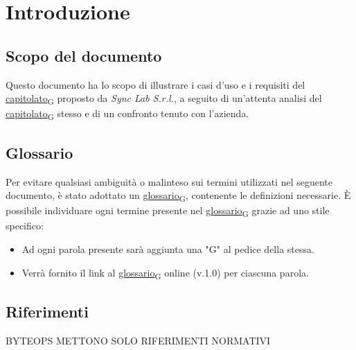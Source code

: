 \section{Introduzione}
\setcounter{subsection}{0}
\subsection{Scopo del documento}
Questo documento ha lo scopo di illustrare i casi d'uso e i requisiti del \href{https://7last.github.io/docs/rtb/documentazione-interna/glossario#capitolato}{capitolato\textsubscript{G}} proposto da \textit{Sync Lab S.r.l.}, a seguito di un'attenta analisi del \href{https://7last.github.io/docs/rtb/documentazione-interna/glossario#capitolato}{capitolato\textsubscript{G}} stesso e di un confronto tenuto con l'azienda.
\subsection{Glossario}
Per evitare qualsiasi ambiguità o malinteso sui termini utilizzati nel seguente documento, è stato adottato un \href{https://7last.github.io/docs/rtb/documentazione-interna/glossario#glossario}{glossario\textsubscript{G}}, contenente le definizioni necessarie. È possibile individuare ogni termine presente nel \href{https://7last.github.io/docs/rtb/documentazione-interna/glossario#glossario}{glossario\textsubscript{G}} grazie ad uno stile specifico:
\begin{itemize}
    \item Ad ogni parola presente sarà aggiunta una "G" al pedice della stessa.
    \item Verrà fornito il link al \href{https://7last.github.io/docs/rtb/documentazione-interna/glossario#glossario}{glossario\textsubscript{G}} online (v.1.0) per ciascuna parola.
\end{itemize}

\subsection{Riferimenti} BYTEOPS METTONO SOLO RIFERIMENTI NORMATIVI
